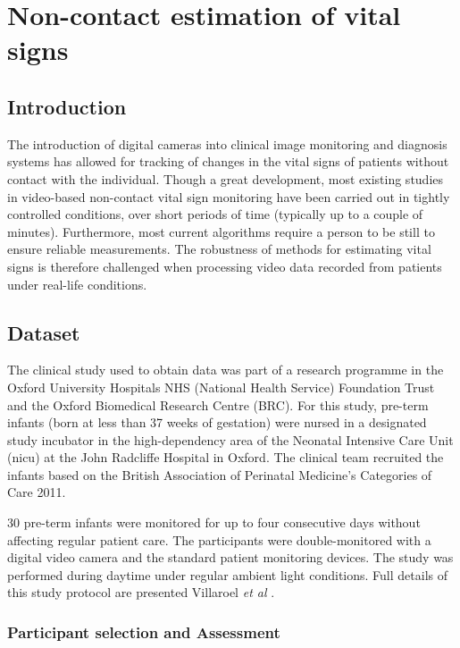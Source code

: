 \chapter{Non-contact estimation of vital signs}
\section{Introduction} 

The introduction of digital cameras into clinical image monitoring and diagnosis systems has allowed for tracking of changes in the vital signs of patients without contact with the individual. Though a great development, most existing studies in video-based non-contact vital sign monitoring have been carried out in tightly controlled conditions, over short periods of time (typically up to a couple of minutes). Furthermore, most current algorithms require a person to be still to ensure reliable measurements. The robustness of methods for estimating vital signs is therefore challenged when processing video data recorded from patients under real-life conditions.

\section{Dataset}

The clinical study used to obtain data was part of a research programme in the Oxford University Hospitals NHS (National Health Service) Foundation Trust and the Oxford Biomedical Research Centre (BRC). For this study, pre-term infants (born at less than 37 weeks of gestation) were nursed in a designated study incubator in the high-dependency area of the Neonatal Intensive Care Unit (\gls{nicu}) at the John Radcliffe Hospital in Oxford. The clinical team recruited the infants based on the British Association of Perinatal Medicine's Categories of Care 2011. 

30 pre-term infants were monitored for up to four consecutive days without affecting regular patient care. The participants were double-monitored with a digital video camera and the standard patient monitoring devices. The study was performed during daytime under regular ambient light conditions. Full details of this study protocol are presented Villaroel \textit{et al} \cite{villarroel2019non}.

\subsection{Participant selection and Assessment}

